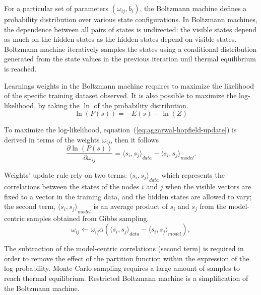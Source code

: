 For a particular set of parameters $(\omega_{ij}, b_{i})$, the Boltzmann machine defines a probability distribution over various state configurations.
In Boltzmann machines, the dependence between all pairs of states is undirected: the visible states depend as much on the hidden states as the hidden states depend on visible states.
Boltzmann machine iteratively samples the states using a conditional distribution generated from the state values in the previous iteration unil thermal equilibrium is reached.

Learnings weights in the Boltzmann machine requires to maximize the likelihood of the specific training dataset observed.
It is also possible to maximize the log-likelihood, by taking the $\ln$ of the probability distribution.
\begin{equation}
    \label{eq:aggarwal-log-likelihood}
    \ln(P(s)) = - E(s) - \ln(Z)
\end{equation}

To maximize the log-likelihood, equation~(\ref{eq:aggarwal-hopfield-update}) is derived in terms of the weights $\omega_{ij}$, then it follows
\begin{equation}
    \label{eq:aggarwal-log-likelihood-max}
    \frac{\partial \ln(P(s))}{\partial \omega_{ij}} = {\langle s_{i}, s_{j} \rangle}_{data} - {\langle s_{i}, s_{j}
    \rangle}_{model}.
\end{equation}

Weights' update rule rely on two terms: ${\langle s_{i}, s_{j} \rangle}_{data}$ which represents the correlations between the states of the nodes $i$ and $j$ when the visible vectors are fixed to a vector in the training data, and the hidden states are allowed to vary; the second term, ${\langle s_{i}, s_{j} \rangle}_{model}$ is an average product of $s_{i}$ and $s_{j}$ from the model-centric samples obtained from Gibbs sampling. 
\begin{equation}
    \label{eq:aggarwal-bm-weight-update}
    \omega_{ij} \leftarrow \omega_{ij} \alpha ({\langle s_{i}, s_{j} \rangle}_{data} - {\langle s_{i}, s_{j} \rangle}_{model}),
\end{equation}

The subtraction of the model-centric correlations (second term) is required in order to remove the effect of the partition function within the expression of the log probability.
Monte Carlo sampling requires a large amount of samples to reach thermal equilibrium.
Restricted Boltzmann machine is a simplification of the Boltzmann machine.

